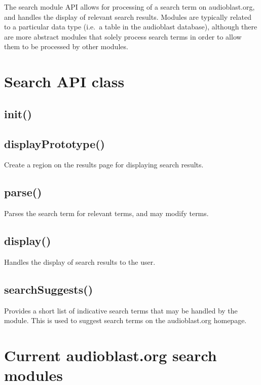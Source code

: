 \documentclass[
]{book}
\begin{document}
The search module API allows for processing of a search term on audioblast.org, and handles the display of relevant search results. Modules are typically related to a particular data type (i.e.~a table in the audioblast database), although there are more abstract modules that solely process search terms in order to allow them to be processed by other modules.

\hypertarget{search-api-class}{%
\section{Search API class}\label{search-api-class}}

\hypertarget{init}{%
\subsection{init()}\label{init}}

\hypertarget{displayprototype}{%
\subsection{displayPrototype()}\label{displayprototype}}

Create a region on the results page for displaying search results.

\hypertarget{parse}{%
\subsection{parse()}\label{parse}}

Parses the search term for relevant terms, and may modify terms.

\hypertarget{display}{%
\subsection{display()}\label{display}}

Handles the display of search results to the user.

\hypertarget{searchsuggests}{%
\subsection{searchSuggests()}\label{searchsuggests}}

Provides a short list of indicative search terms that may be handled by the module. This is used to suggest search terms on the audioblast.org homepage.

\hypertarget{current-audioblast.org-search-modules}{%
\section{Current audioblast.org search modules}\label{current-audioblast.org-search-modules}}
\end{document}
